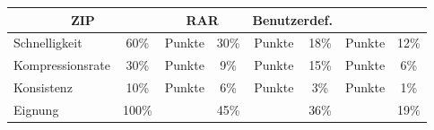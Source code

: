 \begin{table}[H]
\begin{center}
\begin{tabularx} {\linewidth}{|X|c|c|c|c|c|c|c|}
			\multicolumn{2}{c|}{\textbf{ZIP}} &
			\multicolumn{2}{c|}{\textbf{RAR}} & 
			\multicolumn{2}{c|}{\textbf{Benutzerdef.}} \\
			\hline
			Schnelligkeit & 60\% & Punkte & 30\% & Punkte & 18\% & Punkte & 12\% \\
			\hline
			Kompressionsrate & 30\% & Punkte & 9\% & Punkte & 15\% & Punkte & 6\% \\
			\hline
			Konsistenz & 10\% & Punkte & 6\% & Punkte & 3\% & Punkte & 1\% \\
			\hline
			Eignung & 100\% &  & 45\% &  & 36\% &  & 19\% \\
			\cline{1-2}\cline{4-4}\cline{6-6}\cline{8-8}
		\end{tabularx}
	\end{center}
\end{table}